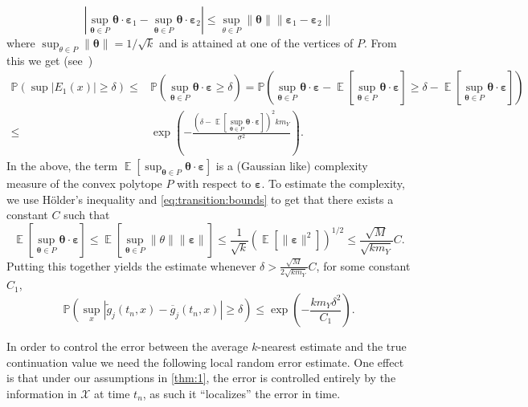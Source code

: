 \documentclass[11pt,reqno,a4paper]{amsart}
\theoremstyle{definition}
\numberwithin{equation}{section}
\newcommand{\widebar}[1]{\overline{#1}}
\renewcommand{\P}{\mathbb{P}}
\DeclareMathOperator{\E}{\mathbb{E}}
\DeclareMathOperator{\1}{\mathbbm{1}}
\begin{document}
\begin{equation*}
  |\sup_{\bm{\theta} \in P} \bm{\theta} \cdot \bm{\varepsilon}_1 - \sup_{\bm{\theta} \in P} \bm{\theta} \cdot \bm{\varepsilon}_2|
  \leq
  \sup_{\theta \in P} \|\bm{\theta}\| \|\bm{\varepsilon}_1 - \bm{\varepsilon}_2\|
\end{equation*}
where $\sup_{\theta \in P} \|\bm{\theta}\| = 1/\sqrt{k}$ and is attained at one of the vertices of $P$.
From this we get (see~\cite{ledoux2006concentration})
\begin{align*}
  \P(\sup |E_1(x)| \geq \delta)
  \leq &
  \P(\sup_{\bm{\theta} \in P} \bm{\theta} \cdot \bm{\varepsilon} \geq \delta)
  =
  \P \left (\sup_{\bm{\theta} \in P} \bm{\theta} \cdot \bm{\varepsilon} - \E[\sup_{\bm{\theta} \in P} \bm{\theta} \cdot \bm{\varepsilon}] \geq \delta - \E[\sup_{\bm{\theta} \in P} \bm{\theta} \cdot \bm{\varepsilon}] \right )
  \\
  \leq &
  \exp \left ( -\frac{(\delta - \E[\sup_{\bm{\theta} \in P} \bm{\theta} \cdot \bm{\varepsilon}])^2 k m_Y}{\sigma^2} \right ).
\end{align*}
In the above, the term $\E[\sup_{\bm{\theta} \in P} \bm{\theta} \cdot \bm{\varepsilon}]$ is a (Gaussian like) complexity measure of the convex polytope $P$ with respect to $\bm{\varepsilon}$.
To estimate the complexity, we use Hölder's inequality and \cref{eq:transition:bounds} to get that there exists a constant $C$ such that
\begin{equation*}
  \E[\sup_{\bm{\theta} \in P} \bm{\theta} \cdot \bm{\varepsilon}] \leq \E[\sup_{\bm{\theta} \in P} \|\theta\| \| \bm{\varepsilon} \|] \leq \frac{1}{\sqrt{k}} \left ( \E[\|\bm{\varepsilon}\|^2] \right )^{1/2} \leq \frac{\sqrt{M}}{\sqrt{k m_Y}} C.
\end{equation*}
Putting this together yields the estimate whenever $\delta > \frac{\sqrt{M}}{2\sqrt{k m_Y}} C$, for some constant $C_1$,
\begin{equation*}
  \P \left (\sup_{x} |\widetilde{g}_j(t_n,x) - \widebar{g}_j(t_n,x)| \geq \delta \right ) \leq \exp \left (-\frac{k m_Y \delta^2}{C_1} \right ).
\end{equation*}


In order to control the error between the average $k$-nearest estimate and the true continuation value we need the following local random error estimate. One effect is that under our assumptions in \cref{thm:1}, the error is controlled entirely by the information in $\mathcal{X}$ at time $t_n$, as such it ``localizes'' the error in time.
\end{document}
